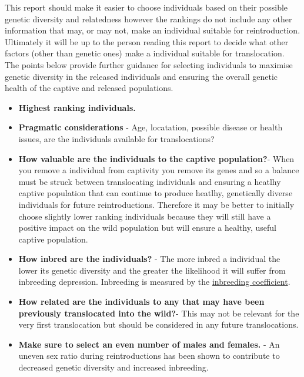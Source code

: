 \documentclass[12pt,]{article}
\begin{document}
This report should make it easier to choose individuals based on their
possible genetic diversity and relatedness however the rankings do not
include any other information that may, or may not, make an individual
suitable for reintroduction. Ultimately it will be up to the person
reading this report to decide what other factors (other than genetic
ones) make a individual suitable for translocation. The points below
provide further guidance for selecting individuals to maximise genetic
diversity in the released individuals and ensuring the overall genetic
health of the captive and released populations.

\begin{itemize}
\item \textbf{Highest ranking individuals.}\newline 
\item \textbf{Pragmatic considerations} - Age, locatation, possible disease or health issues, are the individuals available for translocations?\newline  
\item \textbf{How valuable are the individuals to the captive population?}- When you remove a individual from captivity you remove its genes and so a balance must be struck between translocating individuals and ensuring a heatlhy captive population that can continue to produce heatlhy, genetically diverse individuals for future reintroductions. Therefore it may be better to initially choose slightly lower ranking individuals because they will still have a positive impact on the wild population but will ensure a healthy, useful captive population.\newline
\item \textbf{How inbred are the individuals?} - The more inbred a individual the lower its genetic diversity and the greater the likelihood it will suffer from inbreeding depression. Inbreeding is measured by the \hyperlink{term4}{inbreeding coefficient}.\newline
\item \textbf{How related are the individuals to any that may have been previously translocated into the wild?}- This may not be relevant for the very first translocation but should be considered in any future translocations.\newline
\item \textbf{Make sure to select an even number of males and females.} - An uneven sex ratio during reintroductions has been shown to contribute to decreased genetic diversity and increased inbreeding.\newline 
\end{itemize}
\end{document}
